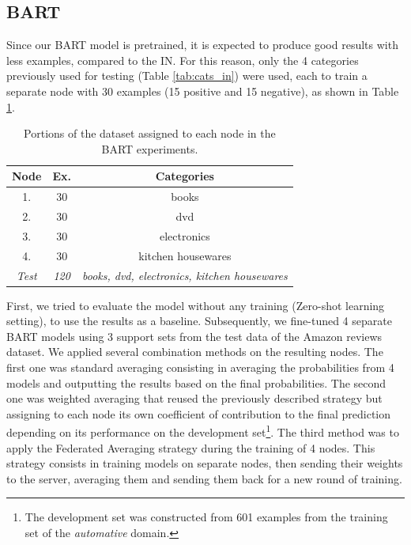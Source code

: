 \documentclass{esannV2}
\begin{document}
    \subsection{BART} Since our BART model is pretrained, it is expected to produce good results with less examples, compared to the IN. For this reason, only the 4 categories previously used for testing (Table \ref{tab:cats_in}) were used, each to train a separate node with 30 examples (15 positive and 15 negative), as shown in Table \ref{tab:cats_b}.
        
    \begin{table}[h!]
    \centering
    \begin{tabular}{|c|c|c|}
    \hline
    Node & Ex. & Categories\\
    \hline
    1. & 30 & books\\
    2. & 30 & dvd\\
    3. & 30 & electronics\\
    4. & 30 & kitchen housewares\\
    \textit{Test} & \textit{120} & \textit{books, dvd, electronics, kitchen housewares}\\
    \hline
    \end{tabular}
    \caption{Portions of the dataset assigned to each node in the BART experiments.}\label{tab:cats_b}
    \end{table}
    
    First, we tried to evaluate the model without any training (Zero-shot learning setting), to use the results as a baseline. Subsequently, we fine-tuned 4 separate BART models using 3 support sets from the test data of the Amazon reviews dataset. We applied several combination methods on the resulting nodes. The first one was standard averaging consisting in averaging the probabilities from 4 models and outputting the results based on the final probabilities. The second one was weighted averaging that reused the previously described strategy but assigning to each node its own coefficient of contribution to the final prediction depending on its performance on the development set\footnote{The development set was constructed from 601 examples from the training set of the \textit{automative} domain.}. The third method was to apply the Federated Averaging strategy\cite{mcmahan2017communication} during the training of 4 nodes. This strategy consists in training models on separate nodes, then sending their weights to the server, averaging them and sending them back for a new round of training. 
\end{document}
